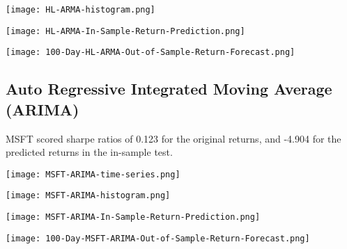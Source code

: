 \begin{center}  
    \texttt{[image: HL-ARMA-histogram.png]}
    \label{fig:nonfloat}
\end{center}

\begin{center}
    \texttt{[image: HL-ARMA-In-Sample-Return-Prediction.png]}
    \label{fig:nonfloat}
\end{center}

\begin{center}
    \texttt{[image: 100-Day-HL-ARMA-Out-of-Sample-Return-Forecast.png]}
    \label{fig:nonfloat}
\end{center}

\subsection{Auto Regressive Integrated Moving Average (ARIMA)}

MSFT scored sharpe ratios of 0.123 for the original returns, and -4.904 for the predicted returns in the in-sample test.

\begin{center}  
    \texttt{[image: MSFT-ARIMA-time-series.png]}
    \label{fig:nonfloat}
\end{center}

\begin{center}
    \texttt{[image: MSFT-ARIMA-histogram.png]}
    \label{fig:nonfloat}
\end{center}

\begin{center}  
    \texttt{[image: MSFT-ARIMA-In-Sample-Return-Prediction.png]}
    \label{fig:nonfloat}
\end{center}

\begin{center}
    \texttt{[image: 100-Day-MSFT-ARIMA-Out-of-Sample-Return-Forecast.png]}
    \label{fig:nonfloat}
\end{center}

